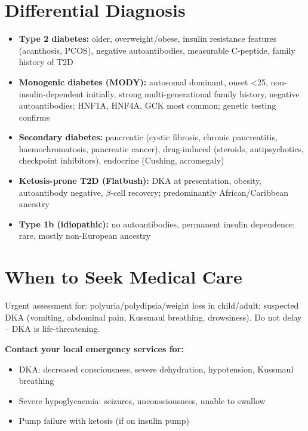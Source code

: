 \section*{Differential Diagnosis}
\begin{itemize}
    \item \textbf{Type 2 diabetes:} older, overweight/obese, insulin resistance features (acanthosis, PCOS), negative autoantibodies, measurable C-peptide, family history of T2D
    \item \textbf{Monogenic diabetes (MODY):} autosomal dominant, onset <25, non-insulin-dependent initially, strong multi-generational family history, negative autoantibodies; HNF1A, HNF4A, GCK most common; genetic testing confirms
    \item \textbf{Secondary diabetes:} pancreatic (cystic fibrosis, chronic pancreatitis, haemochromatosis, pancreatic cancer), drug-induced (steroids, antipsychotics, checkpoint inhibitors), endocrine (Cushing, acromegaly)
    \item \textbf{Ketosis-prone T2D (Flatbush):} DKA at presentation, obesity, autoantibody negative, $\beta$-cell recovery; predominantly African/Caribbean ancestry
    \item \textbf{Type 1b (idiopathic):} no autoantibodies, permanent insulin dependence; rare, mostly non-European ancestry
\end{itemize}

\section*{When to Seek Medical Care}
Urgent assessment for: polyuria/polydipsia/weight loss in child/adult; suspected DKA (vomiting, abdominal pain, Kussmaul breathing, drowsiness). Do not delay -- DKA is life-threatening.

\textbf{Contact your local emergency services for:}
\begin{itemize}
    \item DKA: decreased consciousness, severe dehydration, hypotension, Kussmaul breathing
    \item Severe hypoglycaemia: seizures, unconsciousness, unable to swallow
    \item Pump failure with ketosis (if on insulin pump)
\end{itemize}

